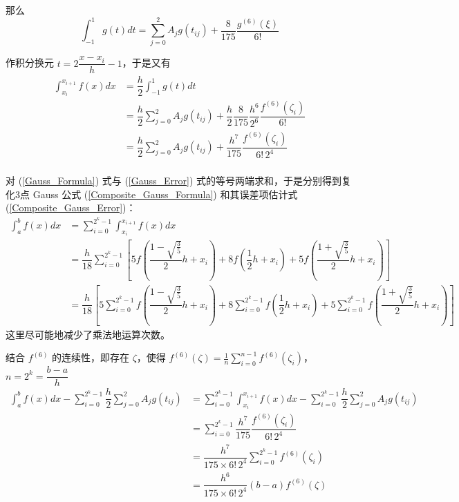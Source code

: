 \documentclass{ctexart}
\begin{document}
	那么
	\begin{equation}
		\int_{-1}^{1} g(t) dt = \sum_{j = 0}^{2} A_j g(t_{ij}) + \dfrac{8}{175}\dfrac{g^{(6)}(\xi)}{6!}
	\end{equation}
	
	作积分换元 $t = 2 \dfrac{x - x_i}{h} - 1$，于是又有
	\begin{equation}
	\label{Gauss_Error}
	\begin{aligned}
		\int_{x_i}^{x_{i+1}} f(x) dx & = \dfrac{h}{2} \int_{-1}^{1} g(t) dt\\
		& = \dfrac{h}{2} \sum_{j = 0}^{2} A_j g(t_{ij}) + \dfrac{h}{2} \dfrac{8}{175} \dfrac{h^6}{2^6} \dfrac{f^{(6)}(\zeta_i)}{6!}\\
		& = \dfrac{h}{2} \sum_{j = 0}^{2} A_j g(t_{ij}) + \dfrac{h^7}{175} \dfrac{f^{(6)}(\zeta_i)}{6! \, 2^4}\\
	\end{aligned}
	\end{equation}
	
	
	对 (\ref{Gauss_Formula}) 式与 (\ref{Gauss_Error}) 式的等号两端求和，于是分别得到复化3点 Gauss 公式 (\ref{Composite_Gauss_Formula}) 和其误差项估计式 (\ref{Composite_Gauss_Error})：
	\begin{equation}
	\label{Composite_Gauss_Formula}
	\begin{aligned}
		\int_a^b f(x)dx & = \sum_{i = 0}^{2^k - 1} \int_{x_i}^{x_{i+1}} f(x)dx\\
		& = \dfrac{h}{18} \sum_{i = 0}^{2^k - 1}\left[5 f\left(\dfrac{1 - \sqrt{\frac{3}{5}}}{2} h + x_i\right) + 8 f\left(\dfrac{1}{2} h + x_i\right) + 5 f\left(\dfrac{1 + \sqrt{\frac{3}{5}}}{2} h + x_i\right)\right]\\
		& = \dfrac{h}{18} \left[5 \sum_{i = 0}^{2^k - 1} f\left(\dfrac{1 - \sqrt{\frac{3}{5}}}{2} h + x_i\right) + 8 \sum_{i = 0}^{2^k - 1} f\left(\dfrac{1}{2} h + x_i\right) + 5 \sum_{i = 0}^{2^k - 1} f\left(\dfrac{1 + \sqrt{\frac{3}{5}}}{2} h + x_i\right)\right]
	\end{aligned}
	\end{equation}
	这里尽可能地减少了乘法地运算次数。
	
	结合 $f^{(6)}$ 的连续性，即存在 $\zeta$，使得 $f^{(6)}(\zeta) = \displaystyle \frac{1}{n} \sum_{i = 0}^{n - 1} {f^{(6)}(\zeta_i)}$，$n = 2^k = \dfrac{b - a}{h}$
	\begin{equation}
	\label{Composite_Gauss_Error}
	\begin{aligned}
		\int_a^b f(x)dx - \sum_{i = 0}^{2^k - 1} \dfrac{h}{2} \sum_{j = 0}^{2} A_j g(t_{ij}) & =\sum_{i = 0}^{2^k - 1} \int_{x_i}^{x_{i+1}} f(x) dx - \sum_{i = 0}^{2^k - 1} \dfrac{h}{2} \sum_{j = 0}^{2} A_j g(t_{ij})\\
		& = \sum_{i = 0}^{2^k - 1} \dfrac{h^7}{175} \dfrac{f^{(6)}(\zeta_i)}{6! \, 2^4}\\
		& = \dfrac{h^7}{175 \times 6! \, 2^4} \sum_{i = 0}^{2^k - 1} {f^{(6)}(\zeta_i)}\\
		& = \dfrac{h^6}{175 \times 6! \, 2^4} (b - a) {f^{(6)}(\zeta)}
	\end{aligned}
	\end{equation}
	
\end{document}
